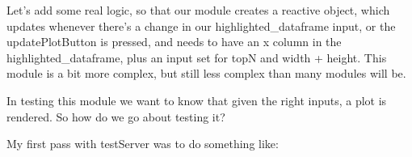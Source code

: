 \documentclass[
  letterpaper,
  DIV=11,
  numbers=noendperiod]{scrreprt}
\newenvironment{Shaded}{\begin{snugshade}}{\end{snugshade}}
\newcommand{\AttributeTok}[1]{\textcolor[rgb]{0.40,0.45,0.13}{#1}}
\newcommand{\ControlFlowTok}[1]{\textcolor[rgb]{0.00,0.23,0.31}{\textbf{#1}}}
\newcommand{\DecValTok}[1]{\textcolor[rgb]{0.68,0.00,0.00}{#1}}
\newcommand{\ErrorTok}[1]{\textcolor[rgb]{0.68,0.00,0.00}{#1}}
\newcommand{\FunctionTok}[1]{\textcolor[rgb]{0.28,0.35,0.67}{#1}}
\newcommand{\NormalTok}[1]{\textcolor[rgb]{0.00,0.23,0.31}{#1}}
\newcommand{\OtherTok}[1]{\textcolor[rgb]{0.00,0.23,0.31}{#1}}
\newcommand{\SpecialCharTok}[1]{\textcolor[rgb]{0.37,0.37,0.37}{#1}}
\begin{document}
Let's add some real logic, so that our module creates a reactive object,
which updates whenever there's a change in our highlighted\_dataframe
input, or the updatePlotButton is pressed, and needs to have an x column
in the highlighted\_dataframe, plus an input set for topN and width +
height. This module is a bit more complex, but still less complex than
many modules will be.

\begin{Shaded}
\end{Shaded}

In testing this module we want to know that given the right inputs, a
plot is rendered. So how do we go about testing it?

My first pass with testServer was to do something like:
\end{document}
